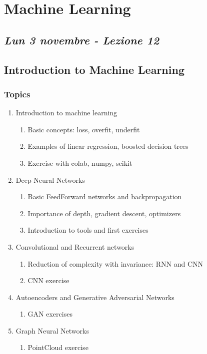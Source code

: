 \chapter{Machine Learning}

\section{\textit{Lun 3 novembre - Lezione 12}}
\section{Introduction to Machine Learning}

\subsection{Topics}

\begin{enumerate}
	\item Introduction to machine learning
		\begin{enumerate}
			\item Basic concepts: loss, overfit, underfit
			\item Examples of linear regression, boosted decision trees
			\item Exercise with colab, numpy, scikit
		\end{enumerate}
	\item Deep Neural Networks
			\begin{enumerate}
			\item Basic FeedForward networks and backpropagation
			\item Importance of depth, gradient descent, optimizers
			\item Introduction to tools and first exercises
			\end{enumerate}
	\item Convolutional and Recurrent networks
		\begin{enumerate}
			\item Reduction of complexity with invariance: RNN and CNN
			\item CNN exercise
		\end{enumerate}
	\item Autoencoders and Generative Adversarial Networks
		\begin{enumerate}
			\item GAN exercises
		\end{enumerate}
	\item Graph Neural Networks
		\begin{enumerate}
			\item PointCloud exercise
		\end{enumerate}
\end{enumerate}

